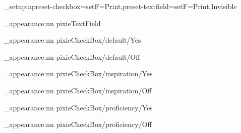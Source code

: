 
\ExplSyntaxOn
\pdffield_setup:n{preset-checkbox={setF=Print},preset-textfield={setF={Print,Invisible}}}

\pdffield_appearance:nn {pixieTextField}{{}} %
\newcommand{\pixieTextField}[3][unsetFf=Multiline]
    {\pdffield_textfield:n{fontcolor=black,name={#2},appearance={pixieTextField},#1}}
    
\pdffield_appearance:nn {pixieCheckBox/default/Yes}
    {\parbox[c][15pt][c]{15pt}{\normalsize\centering{}}}
\pdffield_appearance:nn {pixieCheckBox/default/Off}
    {\parbox[c][15pt][c]{15pt}{\normalsize\centering{}}}
\pdffield_appearance:nn {pixieCheckBox/inspiration/Yes}
    {\parbox[c][20pt][c]{20pt}{\LARGE\centering{}}}
\pdffield_appearance:nn {pixieCheckBox/inspiration/Off}
    {\parbox[c][20pt][c]{20pt}{\LARGE\centering{}}}
\pdffield_appearance:nn {pixieCheckBox/proficiency/Yes}
    {\parbox[c][5pt][c]{5pt}{\tiny\centering{}}}
\pdffield_appearance:nn {pixieCheckBox/proficiency/Off}
    {\parbox[c][5pt][c]{5pt}{\tiny\centering{}}}
\newcommand{\pixieCheckBox}[3][height=15pt,width=15pt]
    {\pdffield_checkbox:n{name=#2,appearance=#3,#1}} %
\ExplSyntaxOff


\newcommand{\pixieHeaderBigField}[2][]
    {\pixieTextField[#1,width=165pt,height=16pt,fontsize=14pt]{#2}}
\newcommand{\pixieHeaderField}[2][]
    {\pixieTextField[height=13pt,fontsize=11pt,#1]{#2}}

\newcommand{\pixieProfNumField}[2][]
    {\pixieTextField[#1,fontsize=7pt,height=7pt,width=14pt,MaxLen=3]{#2}}
\newcommand{\pixieProfCheckBox}[2][]
    {\pixieCheckBox[height=5pt,width=5pt,#1]{#2}{pixieCheckBox/proficiency}}

\newcommand{\pixieSmallNumField}[2][]
    {\pixieTextField[#1,fontsize=8pt,height=8pt]{#2}}
\newcommand{\pixieAttrField}[2][]
    {\pixieSmallNumField[#1,width=15pt,MaxLen=2]{#2}}

